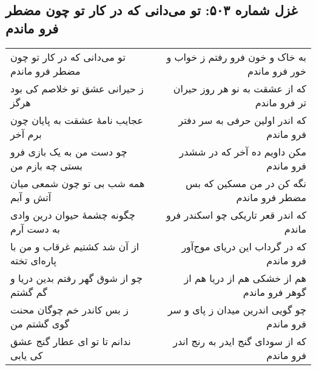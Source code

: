 \begin{center}
\section*{غزل شماره ۵۰۳: تو می‌دانی که در کار تو چون مضطر فرو ماندم}
\label{sec:503}
\begin{longtable}{l p{0.5cm} r}
تو می‌دانی که در کار تو چون مضطر فرو ماندم
&&
به خاک و خون فرو رفتم ز خواب و خور فرو ماندم
\\
ز حیرانی عشق تو خلاصم کی بود هرگز
&&
که از عشقت به نو هر روز حیران تر فرو ماندم
\\
عجایب نامهٔ عشقت به پایان چون برم آخر
&&
که اندر اولین حرفی به سر دفتر فرو ماندم
\\
چو دست من به یک بازی فرو بستی چه بازم من
&&
مکن داویم ده آخر که در ششدر فرو ماندم
\\
همه شب بی تو چون شمعی میان آتش و آبم
&&
نگه کن در من مسکین که بس مضطر فرو ماندم
\\
چگونه چشمهٔ حیوان درین وادی به دست آرم
&&
که اندر قعر تاریکی چو اسکندر فرو ماندم
\\
از آن شد کشتیم غرقاب و من با پاره‌ای تخته
&&
که در گرداب این دریای موج‌آور فرو ماندم
\\
چو از شوق گهر رفتم بدین دریا و گم گشتم
&&
هم از خشکی هم از دریا هم از گوهر فرو ماندم
\\
ز بس کاندر خم چوگان محنت گوی گشتم من
&&
چو گویی اندرین میدان ز پای و سر فرو ماندم
\\
ندانم تا تو ای عطار گنج عشق کی یابی
&&
که از سودای گنج ایدر به رنج اندر فرو ماندم
\\
\end{longtable}
\end{center}
